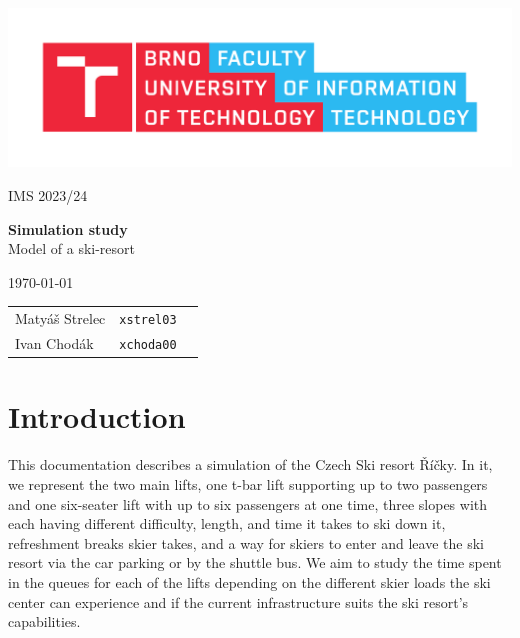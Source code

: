 \documentclass[11pt,a4paper]{article}
\begin{document}
\begin{titlepage}
	\begin{center}
		\includegraphics[scale=0.5]{fit.pdf} \\
		
		\vspace{3cm}

  		\Large{
			IMS 2023/24 \\
		}

      \vspace{3cm}
    
		\Huge{
			\textbf{
				Simulation study} \\
    }
		\vspace{0.5cm}
        \huge {
        Model of a ski-resort
        }

        \vspace{3cm}
                                
		\Large{}
		\today{}
				
		\vspace{2cm}
  
		\begin{tabular}{l l l}
            Matyáš Strelec & \texttt{xstrel03} \\
			Ivan Chodák     & \texttt{xchoda00}  \\
		\end{tabular}
	\end{center}
    \normalsize{}
 \end{titlepage}

\pagebreak{}

\tableofcontents

\pagebreak{}

\section{Introduction}
This documentation describes a simulation \cite[slide 8]{slides} of the Czech Ski resort Říčky\cite{ricky}. In it, we represent the two main lifts, one t-bar lift supporting up to two passengers and one six-seater lift with up to six passengers at one time, three slopes with each having different difficulty, length, and time it takes to ski down it, refreshment breaks skier takes, and a way for skiers to enter and leave the ski resort via the car parking or by the shuttle bus.  \newline
We aim to study the time spent in the queues for each of the lifts depending on the different skier loads the ski center can experience and if the current infrastructure suits the ski resort's capabilities.
\end{document}
